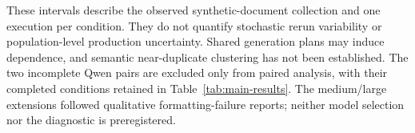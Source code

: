 These intervals describe the observed synthetic-document collection and one execution per condition. They do not quantify stochastic rerun variability or population-level production uncertainty. Shared generation plans may induce dependence, and semantic near-duplicate clustering has not been established. The two incomplete Qwen pairs are excluded only from paired analysis, with their completed conditions retained in Table~\ref{tab:main-results}. The medium/large extensions followed qualitative formatting-failure reports; neither model selection nor the diagnostic is preregistered.

